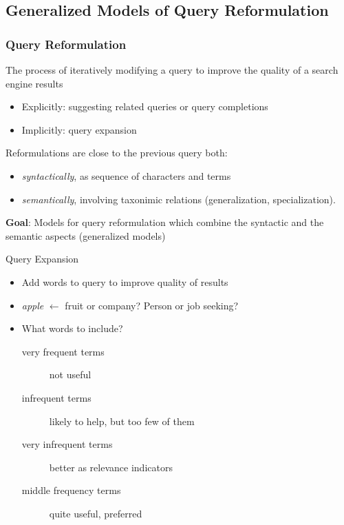 \subsection{Generalized Models of Query Reformulation}

\begin{frame}
	\frametitle{Query Reformulation}
	\begin{block}
	 {The process of iteratively modifying a query to improve
the quality of a search engine results}
	\end{block}
	\begin{itemize}	
	 \item Explicitly: suggesting related queries or query completions
	 \item Implicitly: query expansion
	\end{itemize}
	\vskip5pt
	Reformulations are close to the previous query both:
	\begin{itemize}
	 \item \textit{syntactically}, as sequence of characters and terms
	 \item \textit{semantically}, involving taxonimic relations (generalization, specialization).
	\end{itemize}
	\textbf{Goal}: Models for query reformulation which combine the syntactic and
the semantic aspects (generalized models)

\end{frame}

\begin{frame}{Query Expansion}
  \begin{itemize}
    \item Add words to query to improve quality of results
    \item \textit{apple} $\leftarrow$ fruit or company? Person or job seeking?
    \item What words to include?
    \pause
    \begin{description}
      \item[very frequent terms] not useful
      \item[infrequent terms] likely to help, but too few of them
      \item[very infrequent terms] better as relevance indicators
      \item[middle frequency terms] quite useful, preferred
    \end{description}
  \end{itemize}
\end{frame}


